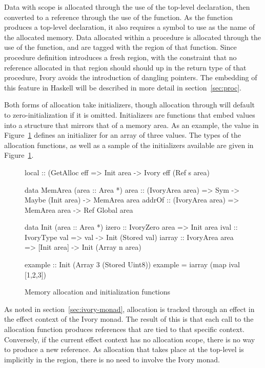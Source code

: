 Data with  scope is allocated through the use of the 
top-level declaration, then converted to a reference through the use of the
 function.  As the  function produces a top-level
declaration, it also requires a symbol to use as the name of the allocated
memory.  Data allocated within a procedure is allocated through the use of the
 function, and are tagged with the region of that function.  Since
procedure definition introduces a fresh region, with the constraint that no
reference allocated in that region should should up in the return type of that
procedure, Ivory avoids the introduction of dangling pointers.  The embedding of
this feature in Haskell will be described in more detail in
section~\ref{sec:proc}.

Both forms of allocation take initializers, though  allocation
through  will default to zero-initialization if it is omitted.
Initializers are functions that embed values into a structure that mirrors that
of a memory area.  As an example, the  value in
Figure~\ref{fig:mem-alloc} defines an initializer for an array of three
 values.  The types of the allocation functions, as well as a sample
of the initializers available are given in Figure~\ref{fig:mem-alloc}.

\begin{figure}
\begin{code}
local  :: (GetAlloc eff %
       => Init area -> Ivory eff (Ref s area)

data MemArea (area :: Area *)
area   :: (IvoryArea area)
       => Sym -> Maybe (Init area) -> MemArea area
addrOf :: (IvoryArea area)
       => MemArea area -> Ref Global area

data Init (area :: Area *)
izero  :: IvoryZero area => Init area
ival   :: IvoryType val  => val -> Init (Stored val)
iarray :: IvoryArea area
       => [Init area] -> Init (Array n area)

example :: Init (Array 3 (Stored Uint8))
example  = iarray (map ival [1,2,3])
\end{code}
\caption{Memory allocation and initialization functions}
\label{fig:mem-alloc}
\end{figure}

As noted in section~\ref{sec:ivory-monad}, allocation is tracked through an
effect in the effect context of the Ivory monad.  The result of this is that
each call to the  allocation function produces references that are
tied to that specific context.  Conversely, if the current effect context has
no allocation scope, there is no way to produce a new reference.  As allocation
that takes place at the top-level is implicitly in the  region, there
is no need to involve the Ivory monad.

